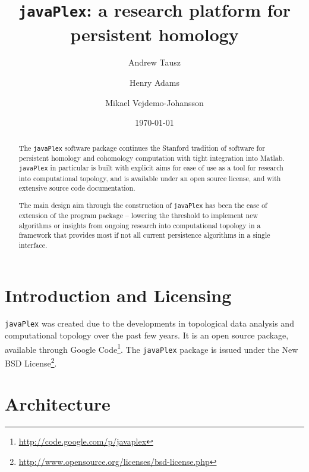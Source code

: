 \documentclass[11pt]{amsart}
\newcommand\javaPlex{\texttt{javaPlex}\xspace}
\begin{document}
\title{\javaPlex: a research platform for persistent homology }

\author{Andrew Tausz}
\address{Stanford University, Stanford, CA, 94305}

\author{Henry Adams}
\address{Stanford University, Stanford, CA, 94305}

\author{Mikael Vejdemo-Johansson}
\address{School of Computer Science; University of St Andrews; Scotland}

\date{\today}

\begin{abstract}
The \javaPlex software package continues the Stanford tradition of software for persistent homology and cohomology computation with tight integration into Matlab. \javaPlex in particular is built with explicit aims for ease of use as a tool for research into computational topology, and is available under an open source license, and with extensive source code documentation.

The main design aim through the construction of \javaPlex has been the ease of extension of the program package -- lowering the threshold to implement new algorithms or insights from ongoing research into computational topology in a framework that provides most if not all current persistence algorithms in a single interface.
\end{abstract}

\maketitle

\section{Introduction and Licensing}

\javaPlex was created due to the developments in topological data analysis and computational topology over the past few years. It is an open source package, available through Google Code\footnote{\url{http://code.google.com/p/javaplex}}. The \javaPlex package is issued under the New BSD License\footnote{\url{http://www.opensource.org/licenses/bsd-license.php}}. 

\section{Architecture}
\end{document}
